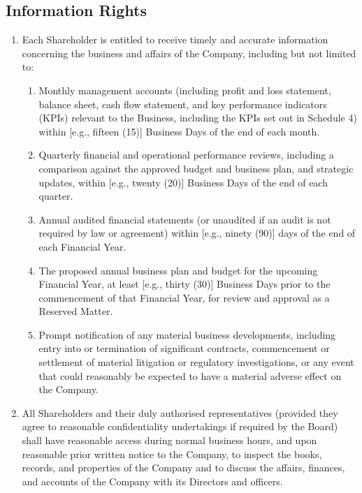 \subsection{Information Rights}
\begin{enumerate}[label=(\alph*), wide, labelwidth=!, labelindent=0pt]
\item Each Shareholder is entitled to receive timely and accurate information concerning the business and affairs of the Company, including but not limited to:
    \begin{enumerate}[label=(\roman*), wide, labelwidth=!, labelindent=0pt]
    \item Monthly management accounts (including profit and loss statement, balance sheet, cash flow statement, and key performance indicators (KPIs) relevant to the Business, including the KPIs set out in Schedule 4) within [e.g., fifteen (15)] Business Days of the end of each month.
    \item Quarterly financial and operational performance reviews, including a comparison against the approved budget and business plan, and strategic updates, within [e.g., twenty (20)] Business Days of the end of each quarter.
    \item Annual audited financial statements (or unaudited if an audit is not required by law or agreement) within [e.g., ninety (90)] days of the end of each Financial Year.
    \item The proposed annual business plan and budget for the upcoming Financial Year, at least [e.g., thirty (30)] Business Days prior to the commencement of that Financial Year, for review and approval as a Reserved Matter.
    \item Prompt notification of any material business developments, including entry into or termination of significant contracts, commencement or settlement of material litigation or regulatory investigations, or any event that could reasonably be expected to have a material adverse effect on the Company.
    \end{enumerate}
\item All Shareholders and their duly authorised representatives (provided they agree to reasonable confidentiality undertakings if required by the Board) shall have reasonable access during normal business hours, and upon reasonable prior written notice to the Company, to inspect the books, records, and properties of the Company and to discuss the affairs, finances, and accounts of the Company with its Directors and officers.
\end{enumerate}

